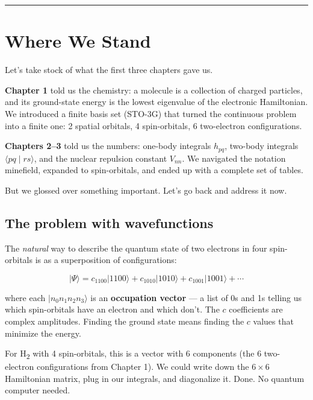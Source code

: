 \documentclass[
  11pt,
  oneside]{book}
\begin{document}
\begin{center}\rule{0.5\linewidth}{0.5pt}\end{center}

\section{Where We Stand}\label{where-we-stand}

Let's take stock of what the first three chapters gave us.

\textbf{Chapter 1} told us the chemistry: a molecule is a collection of
charged particles, and its ground-state energy is the lowest eigenvalue
of the electronic Hamiltonian. We introduced a finite basis set (STO-3G)
that turned the continuous problem into a finite one: 2 spatial
orbitals, 4 spin-orbitals, 6 two-electron configurations.

\textbf{Chapters 2--3} told us the numbers: one-body integrals
\(h_{pq}\), two-body integrals \(\langle pq \mid rs\rangle\), and the
nuclear repulsion constant \(V_{nn}\). We navigated the notation
minefield, expanded to spin-orbitals, and ended up with a complete set
of tables.

But we glossed over something important. Let's go back and address it
now.

\subsection{The problem with
wavefunctions}\label{the-problem-with-wavefunctions}

The \emph{natural} way to describe the quantum state of two electrons in
four spin-orbitals is as a superposition of configurations:

\[\lvert \Psi \rangle = c_{1100}\lvert 1100\rangle + c_{1010}\lvert 1010\rangle + c_{1001}\lvert 1001\rangle + \cdots\]

where each \(\lvert n_0 n_1 n_2 n_3\rangle\) is an \textbf{occupation
vector} --- a list of 0s and 1s telling us which spin-orbitals have an
electron and which don't. The \(c\) coefficients are complex amplitudes.
Finding the ground state means finding the \(c\) values that minimize
the energy.

For H\textsubscript{2} with 4 spin-orbitals, this is a vector with 6 components (the 6
two-electron configurations from Chapter 1). We could write down the
\(6 \times 6\) Hamiltonian matrix, plug in our integrals, and
diagonalize it. Done. No quantum computer needed.
\end{document}
